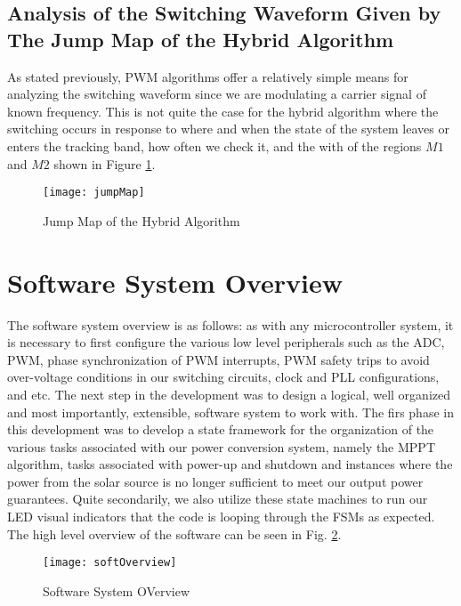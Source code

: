\subsection{Analysis of the Switching Waveform Given by The Jump Map of the Hybrid Algorithm}
As stated previously, PWM algorithms offer a relatively simple means for analyzing the switching waveform since we are modulating a carrier signal of known frequency. This is not quite the case for the hybrid algorithm where the switching occurs in response to where and when the state of the system leaves or enters the tracking band, how often we check it, and the with of the regions $M1$ and $M2$ shown in Figure \ref{jump}.

\begin{figure}[htbp]
\begin{center}
\texttt{[image: jumpMap]}
\caption{Jump Map of the Hybrid Algorithm \cite{ricardo}}
\label{jump}
\end{center}
\end{figure}

\section{Software System Overview}
\label{softOver}
The software system overview is as follows: as with any microcontroller system, it is necessary to first configure the various low level peripherals such as the ADC, PWM, phase synchronization of PWM interrupts, PWM safety trips to avoid over-voltage conditions in our switching circuits, clock and PLL configurations, and etc. The next step in the development was to design a logical, well organized and most importantly, extensible, software system to work with. The firs phase in this development was to develop a state framework for the organization of the various tasks associated with our power conversion system, namely the MPPT algorithm, tasks associated with power-up and shutdown and instances where the power from the solar source is no longer sufficient to meet our output power guarantees. Quite secondarily, we also utilize these state machines to run our LED visual indicators that the code is looping through the FSMs as expected. The high level overview of the software can be seen in Fig. \ref{soft}.

\begin{figure}[htp]
\begin{center}
\texttt{[image: softOverview]}
\caption{Software System OVerview}
\label{soft}
\end{center}
\end{figure}

